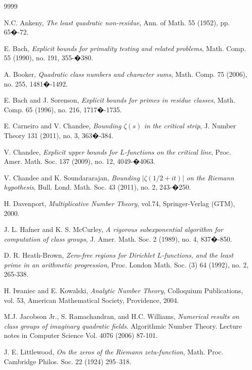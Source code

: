 \documentclass [12pt]{amsart}
\numberwithin{equation}{section}
\begin{document}
\begin{thebibliography}{9999}

 N.C. Ankeny, {\it The least quadratic non-residue}, Ann. of Math. 55 (1952), pp. 65�-72.

 E. Bach, {\it Explicit bounds for primality testing and related problems}, Math. Comp. 55 (1990), no. 191, 355-�380.

 A. Booker, {\it  Quadratic class numbers and character sums}, Math. Comp. 75 (2006), no. 255, 1481�-1492.


 E. Bach and J. Sorenson, {\it Explicit bounds for primes in residue classes}, Math. Comp. 65 (1996), no. 216, 1717�-1735.

 E. Carneiro and V. Chandee, {\it Bounding $\zeta(s)$ in the critical strip}, J. Number Theory 131 (2011), no. 3, 363�-384.

 V. Chandee, {\it Explicit upper bounds for $L$-functions on the critical line}, Proc. Amer. Math. Soc. 137 (2009), no. 12, 4049-�4063.

 V. Chandee and K. Soundararajan, {\it Bounding $|\zeta(1/2+it)|$ on the Riemann hypothesis}, Bull. Lond. Math. Soc. 43 (2011), no. 2, 243-�250.

 H. Davenport, {\it Multiplicative Number Theory}, vol.74, Springer-Verlag (GTM), 2000.

 J. L. Hafner and K. S. McCurley, {\it A rigorous subexponential algorithm for computation of class groups}, J. Amer. Math. Soc. 2 (1989), no. 4, 837�-850.

 D. R. Heath-Brown, {\it Zero-free regions for Dirichlet $L$-functions, and the least prime in an arithmetic progression},
Proc. London Math. Soc. (3) 64 (1992), no. 2, 265-338.

 H. Iwaniec and E. Kowalski, {\it Analytic Number Theory}, Colloquium
Publications, vol. 53, American Mathematical Society, Providence, 2004.

  M.J. Jacobson Jr., S. Ramachandran, and H.C. Williams, 
{\it Numerical results on class groups of imaginary quadratic fields}.  Algorithmic Number Theory.  Lecture 
notes in Computer Science Vol. 4076 (2006) 87-101.

 J. E. Littlewood, {\it On the zeros of the Riemann zeta-function}, Math. Proc. Cambridge Philos. Soc. 22 (1924) 295--318.


\end{thebibliography}
\end{document}
